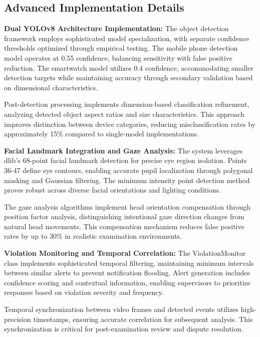 \documentclass[conference]{IEEEtran}
\begin{document}
\subsection{Advanced Implementation Details}

\textbf{Dual YOLOv8 Architecture Implementation:} The object detection framework employs sophisticated model specialization, with separate confidence thresholds optimized through empirical testing\cite{ultralytics}. The mobile phone detection model operates at 0.55 confidence, balancing sensitivity with false positive reduction. The smartwatch model utilizes 0.4 confidence, accommodating smaller detection targets while maintaining accuracy through secondary validation based on dimensional characteristics.

Post-detection processing implements dimension-based classification refinement, analyzing detected object aspect ratios and size characteristics. This approach improves distinction between device categories, reducing misclassification rates by approximately 15\% compared to single-model implementations\cite{redmon2018yolov3}.

\textbf{Facial Landmark Integration and Gaze Analysis:} The system leverages dlib's 68-point facial landmark detection for precise eye region isolation\cite{el2023drowsiness}. Points 36-47 define eye contours, enabling accurate pupil localization through polygonal masking and Gaussian filtering. The minimum intensity point detection method proves robust across diverse facial orientations and lighting conditions.

The gaze analysis algorithms implement head orientation compensation through position factor analysis, distinguishing intentional gaze direction changes from natural head movements. This compensation mechanism reduces false positive rates by up to 30\% in realistic examination environments.

\textbf{Violation Monitoring and Temporal Correlation:} The ViolationMonitor class implements sophisticated temporal filtering, maintaining minimum intervals between similar alerts to prevent notification flooding\cite{pythondatetime}. Alert generation includes confidence scoring and contextual information, enabling supervisors to prioritize responses based on violation severity and frequency.

Temporal synchronization between video frames and detected events utilizes high-precision timestamps, ensuring accurate correlation for subsequent analysis. This synchronization is critical for post-examination review and dispute resolution\cite{pythonlogging}.
\end{document}
